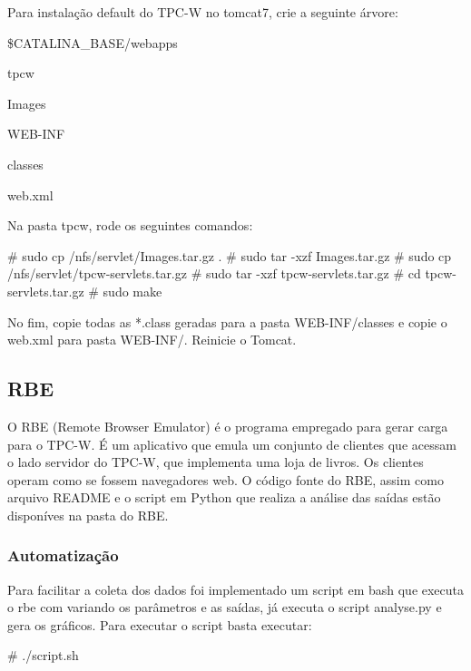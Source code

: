 \documentclass[a4paper,10pt]{article}
\begin{document}
        Para instalação default do TPC-W no tomcat7, crie a seguinte árvore:
        \begin{spverbatim}

            \$CATALINA_BASE/webapps

                tpcw

                     Images

                     WEB-INF

                        classes

                        web.xml


        \end{spverbatim}

        Na pasta tpcw, rode os seguintes comandos:
        \begin{spverbatim}
            # sudo cp /nfs/servlet/Images.tar.gz .
            # sudo tar -xzf Images.tar.gz
            # sudo cp /nfs/servlet/tpcw-servlets.tar.gz
            # sudo tar -xzf tpcw-servlets.tar.gz
            # cd tpcw-servlets.tar.gz
            # sudo make
        \end{spverbatim}

        No fim, copie todas as *.class geradas para a pasta WEB-INF/classes e copie o web.xml para pasta WEB-INF/. Reinicie o Tomcat.

       \subsection{RBE}
        O RBE (Remote Browser Emulator) é o programa empregado para gerar carga para o TPC-W. É um aplicativo que emula um conjunto de clientes que acessam o lado servidor do TPC-W, que implementa uma loja de livros. Os clientes operam como se fossem navegadores web.
        O código fonte do RBE, assim como arquivo README e o script em Python que realiza a análise das saídas estão disponíves na pasta do RBE.

        \subsubsection{Automatização}
        Para facilitar a coleta dos dados foi implementado um script em bash que executa o rbe com variando os parâmetros e as saídas, já executa o script analyse.py e gera os gráficos.
        Para executar o script basta executar:
        \begin{spverbatim}
        # ./script.sh
        \end{spverbatim}
\end{document}
